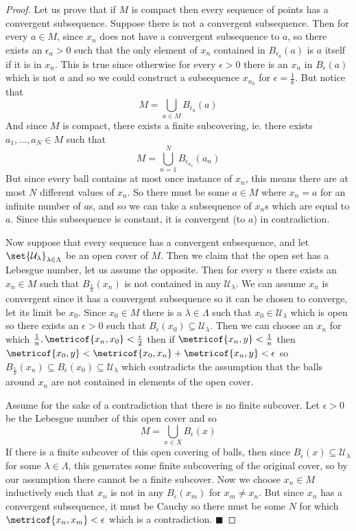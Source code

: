 \documentclass[10pt]{article}
\def\qed{\hskip1cm\penalty-100\hbox{}\hfill$\blacksquare$}
\def\mU{\mathcal{U}}
\begin{document}
\begin{proof}

    Let us prove that if $M$ is compact then every sequence of points has a convergent subsequence.
    Suppose there is not a convergent subsequence.
    Then for every $a\in M$, since $x_n$ does not have a convergent subsequence to $a$, so there exists an $\epsilon_a>0$ such that the only element of $x_n$ contained in $B_{\epsilon_a}(a)$ is $a$ itself if
    it is in $x_n$.
    This is true since otherwise for every $\epsilon>0$ there is an $x_n$ in $B_\epsilon(a)$ which is not $a$ and so we could construct a subsequence $x_{n_k}$ for $\epsilon=\frac1k$.
    But notice that
    \[ M = \bigcup_{a\in M} B_{\epsilon_a}(a) \]
    And since $M$ is compact, there exists a finite subcovering, ie. there exists $a_1,\dots,a_N\in M$ such that
    \[ M = \bigcup_{n=1}^N B_{\epsilon_{a_n}}(a_n) \]
    But since every ball contains at most once instance of $x_n$, this means there are at most $N$ different values of $x_n$.
    So there must be some $a\in M$ where $x_n=a$ for an infinite number of $a$s, and so we can take a subsequence of $x_n$s which are equal to $a$.
    Since this subsequence is constant, it is convergent (to $a$) in contradiction.

    Now suppose that every sequence has a convergent subsequence, and let $\set{\mU_\lambda}_{\lambda\in\Lambda}$ be an open cover of $M$.
    Then we claim that the open set has a Lebesgue number, let us assume the opposite.
    Then for every $n$ there exists an $x_n\in M$ such that $B_{\frac1n}(x_n)$ is not contained in any $\mU_\lambda$.
    We can assume $x_n$ is convergent since it has a convergent subsequence so it can be chosen to converge, let its limit be $x_0$.
    Since $x_0\in M$ there is a $\lambda\in\Lambda$ such that $x_0\in\mU_\lambda$ which is open so there exists an $\epsilon>0$ such that $B_\epsilon(x_0)\subseteq\mU_\lambda$.
    Then we can choose an $x_n$ for which $\frac1n,\metricof{x_n,x_0}<\frac\epsilon2$ then if $\metricof{x_n,y}<\frac1n$ then $\metricof{x_0,y}<\metricof{x_0,x_n}+\metricof{x_n,y}<\epsilon$ so
    $B_{\frac1n}(x_n)\subseteq B_\epsilon(x_0)\subseteq\mU_\lambda$ which contradicts the assumption that the balls around $x_n$ are not contained in elements of the open cover.

    Assume for the sake of a contradiction that there is no finite subcover.
    Let $\epsilon>0$ be the Lebesgue number of this open cover and so
    \[ M = \bigcup_{x\in X} B_\epsilon(x) \]
    If there is a finite subcover of this open covering of balls, then since $B_\epsilon(x)\subseteq\mU_\lambda$ for some $\lambda\in\Lambda$, this generates some finite subcovering of the original
    cover, so by our assumption there cannot be a finite subcover.
    Now we choose $x_n\in M$ inductively such that $x_n$ is not in any $B_\epsilon(x_m)$ for $x_m\neq x_n$.
    But since $x_n$ has a convergent subsequence, it must be Cauchy so there must be some $N$ for which $\metricof{x_n,x_m}<\epsilon$ which is a contradiction.
    \qed

\end{proof}
\end{document}

